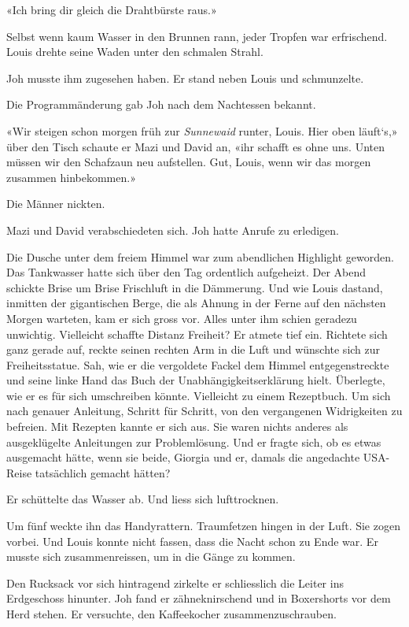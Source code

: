 «Ich bring dir gleich die Drahtbürste raus.»

Selbst wenn kaum Wasser in den Brunnen rann, jeder Tropfen war
erfrischend. Louis drehte seine Waden unter den schmalen Strahl.

Joh musste ihm zugesehen haben. Er stand neben Louis und schmunzelte.

Die Programmänderung gab Joh nach dem Nachtessen bekannt.

«Wir steigen schon morgen früh zur \emph{Sunnewaid} runter, Louis. Hier
oben läuft`s,» über den Tisch schaute er Mazi und David an, «ihr schafft
es ohne uns. Unten müssen wir den Schafzaun neu aufstellen. Gut, Louis,
wenn wir das morgen zusammen hinbekommen.»

Die Männer nickten.

Mazi und David verabschiedeten sich. Joh hatte Anrufe zu erledigen.

Die Dusche unter dem freiem Himmel war zum abendlichen Highlight
geworden. Das Tankwasser hatte sich über den Tag ordentlich aufgeheizt.
Der Abend schickte Brise um Brise Frischluft in die Dämmerung. Und wie
Louis dastand, inmitten der gigantischen Berge, die als Ahnung in der
Ferne auf den nächsten Morgen warteten, kam er sich gross vor. Alles
unter ihm schien geradezu unwichtig. Vielleicht schaffte Distanz
Freiheit? Er atmete tief ein. Richtete sich ganz gerade auf, reckte
seinen rechten Arm in die Luft und wünschte sich zur Freiheitsstatue.
Sah, wie er die vergoldete Fackel dem Himmel entgegenstreckte und seine
linke Hand das Buch der Unabhängigkeitserklärung hielt. Überlegte, wie
er es für sich umschreiben könnte. Vielleicht zu einem Rezeptbuch. Um
sich nach genauer Anleitung, Schritt für Schritt, von den vergangenen
Widrigkeiten zu befreien. Mit Rezepten kannte er sich aus. Sie waren
nichts anderes als ausgeklügelte Anleitungen zur Problemlösung. Und er
fragte sich, ob es etwas ausgemacht hätte, wenn sie beide, Giorgia und
er, damals die angedachte USA-Reise tatsächlich gemacht hätten?

Er schüttelte das Wasser ab. Und liess sich lufttrocknen.

Um fünf weckte ihn das Handyrattern. Traumfetzen hingen in der Luft. Sie
zogen vorbei. Und Louis konnte nicht fassen, dass die Nacht schon zu
Ende war. Er musste sich zusammenreissen, um in die Gänge zu kommen.

Den Rucksack vor sich hintragend zirkelte er schliesslich die Leiter ins
Erdgeschoss hinunter. Joh fand er zähneknirschend und in Boxershorts vor
dem Herd stehen. Er versuchte, den Kaffeekocher zusammenzuschrauben.

